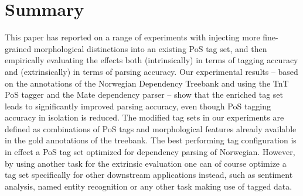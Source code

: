 \documentclass[11pt,a4paper]{article}
\begin{document}
\section{Summary}
\label{sec:summary}
This paper has reported on a range of experiments with injecting more
fine-grained morphological distinctions into an existing PoS tag set, and then
empirically evaluating the effects both (intrinsically) in terms of tagging
accuracy and (extrinsically) in terms of parsing accuracy. Our experimental
results -- based on the annotations of the Norwegian Dependency Treebank and using
the TnT PoS tagger and the Mate dependency parser -- show that the enriched tag
set leads to significantly improved parsing accuracy, even though PoS tagging
accuracy in isolation is reduced. The modified tag sets in our experiments are
defined as combinations of PoS tags and morphological features already
available in the gold annotations of the treebank. The best performing tag
configuration is in effect a PoS tag set optimized for dependency parsing of
Norwegian. However, by using another task for the extrinsic evaluation one can
of course optimize a tag set specifically for other downstream applications
instead, such as sentiment analysis, named entity recognition or any other task
making use of tagged data.




\end{document}

